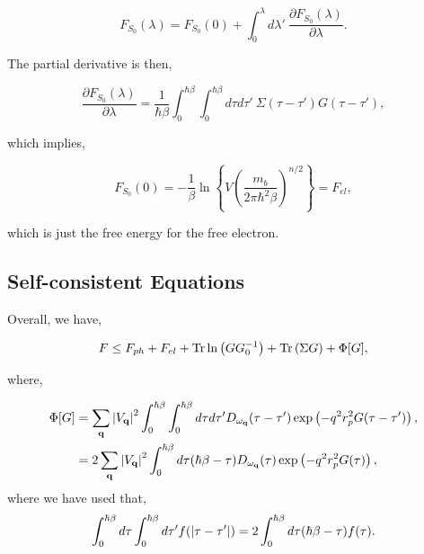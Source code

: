 \begin{equation}
    F_{S_0}(\lambda) = F_{S_0}(0) + \int_0^\lambda d\lambda'\ \frac{\partial F_{S_0}(\lambda)}{\partial \lambda}.
\end{equation}

The partial derivative is then,

\begin{equation}
    \frac{\partial F_{S_0}(\lambda)}{\partial \lambda} = \frac{1}{\hbar\beta} \int_0^{\hbar\beta} \int_0^{\hbar\beta} d\tau d\tau'\ \Sigma(\tau - \tau') G(\tau - \tau'),
\end{equation}

which implies,

\begin{equation}
    F_{S_0}(0) = -\frac{1}{\beta} \ln\left\{V \left( \frac{m_b}{2 \pi \hbar^2 \beta} \right)^{n/2}\right\} = F_{el},
\end{equation}

which is just the free energy for the free electron.

\subsection{Self-consistent Equations}

Overall, we have,

\begin{equation}
    F \leq F_{ph} + F_{el} + \Tr \ln \left(G G_0^{-1}\right)   + \Tr \left( \Sigma G \right) + \Phi[G],
\end{equation}

where, 

\begin{equation}
    \begin{aligned}
        \Phi[G] &= \sum_{\vb{q}} \abs{V_{\vb{q}}}^2 \int_{0}^{\hbar\beta} \int_0^{\hbar\beta} d\tau d\tau' D_{\omega_{\vb{q}}}(\tau - \tau') \exp \left( -q^2 r_p^2 G(\tau - \tau') \right) ,\\
        &= 2 \sum_{\vb{q}} \abs{V_{\vb{q}}}^2 \int_0^{\hbar\beta}  d\tau (\hbar \beta - \tau) D_{\omega_{\vb{q}}} (\tau) \exp\left(-q^2 r_p^2 G(\tau)\right),
    \end{aligned}
\end{equation}
where we have used that,
\begin{equation}
    \int_0^{\hbar\beta} d\tau \int_0^{\hbar\beta} d\tau' f(\abs{\tau - \tau'}) = 2 \int_0^{\hbar\beta} d\tau (\hbar\beta - \tau) f(\tau).
\end{equation}

